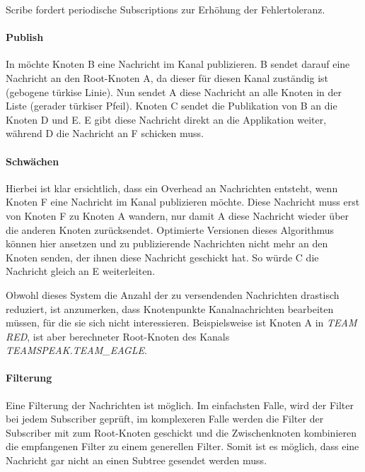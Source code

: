 Scribe fordert periodische Subscriptions zur Erhöhung der Fehlertoleranz.

\paragraph*{Publish}
In  möchte Knoten B eine Nachricht im Kanal publizieren. B sendet darauf eine Nachricht an den Root-Knoten A, da dieser für diesen Kanal zuständig ist (gebogene türkise Linie). Nun sendet A diese Nachricht an alle Knoten in der Liste (gerader türkiser Pfeil). Knoten C sendet die Publikation von B an die Knoten D und E. E gibt diese Nachricht direkt an die Applikation weiter, während D die Nachricht an F schicken muss.


\paragraph*{Schwächen}
Hierbei ist klar ersichtlich, dass ein Overhead an Nachrichten entsteht, wenn Knoten F eine Nachricht im Kanal publizieren möchte. Diese Nachricht muss erst von Knoten F zu Knoten A wandern, nur damit A diese Nachricht wieder über die anderen Knoten zurücksendet. Optimierte Versionen dieses Algorithmus können hier ansetzen und zu publizierende Nachrichten nicht mehr an den Knoten senden, der ihnen diese Nachricht geschickt hat. So würde C die Nachricht gleich an E weiterleiten.


Obwohl dieses System die Anzahl der zu versendenden Nachrichten drastisch reduziert, ist anzumerken, dass Knotenpunkte Kanalnachrichten bearbeiten müssen, für die sie sich nicht interessieren. Beispielsweise ist Knoten A in \emph{TEAM RED}, ist aber berechneter Root-Knoten des Kanals \emph{TEAMSPEAK.TEAM\_EAGLE}.


\paragraph*{Filterung}
Eine Filterung der Nachrichten ist möglich. Im einfachsten Falle, wird der Filter bei jedem Subscriber geprüft, im komplexeren Falle werden die Filter der Subscriber mit zum Root-Knoten geschickt und die Zwischenknoten kombinieren die empfangenen Filter zu einem generellen Filter. Somit ist es möglich, dass eine Nachricht gar nicht an einen Subtree gesendet werden muss.


